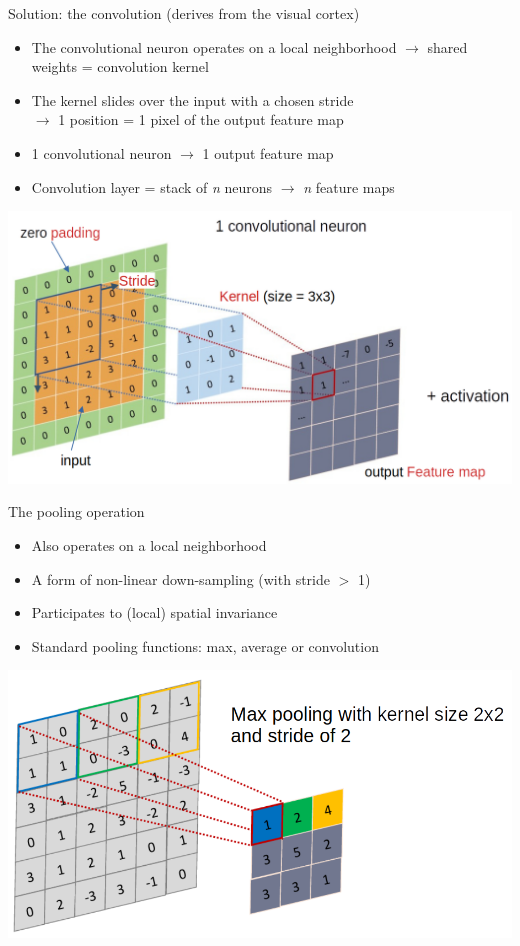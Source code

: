 \documentclass[usenames,dvipsnames]{beamer}
\begin{document}
    \begin{frame}{\secname}{\subsecname}
    Solution: the convolution (derives from the visual cortex)
        \begin{itemize}
            \item The convolutional neuron operates on a local neighborhood $\rightarrow$ shared weights = convolution \alert{kernel}
            \item The kernel slides over the input with a chosen \alert{stride}\\ $\rightarrow$ 1 position = 1 pixel of the output \alert{feature map}
            \item 1 convolutional neuron $\rightarrow$ 1 output feature map
            \item Convolution layer = stack of \textit{n} neurons $\rightarrow$ \textit{n} feature maps
        \end{itemize}
        \vspace{-1em}
        \begin{center}
            \includegraphics[width=0.7\linewidth]{figures/DL_fundamentals/convolution.png}
        \end{center}
    \end{frame}
    \begin{frame}{\secname}{\subsecname}
        The \alert{pooling} operation
        \begin{itemize}
            \item Also operates on a local neighborhood
            \item A form of non-linear down-sampling (with stride $>$ 1)
            \item Participates to (local) spatial invariance
            \item Standard pooling functions: max, average or convolution
        \end{itemize}
        \vspace{-1em}
        \begin{center}
            \includegraphics[width=0.7\linewidth]{figures/DL_fundamentals/maxpooling.png}
        \end{center}
    \end{frame}
\end{document}
